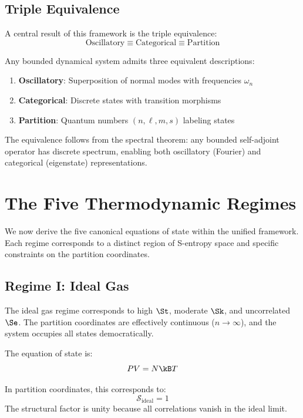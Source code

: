 \subsection{Triple Equivalence}

A central result of this framework is the triple equivalence:
\begin{equation}
\boxed{\text{Oscillatory} \equiv \text{Categorical} \equiv \text{Partition}}
\end{equation}

Any bounded dynamical system admits three equivalent descriptions:
\begin{enumerate}
    \item \textbf{Oscillatory}: Superposition of normal modes with frequencies $\omega_n$
    \item \textbf{Categorical}: Discrete states with transition morphisms
    \item \textbf{Partition}: Quantum numbers $(n, \ell, m, s)$ labeling states
\end{enumerate}

The equivalence follows from the spectral theorem: any bounded self-adjoint operator has discrete spectrum, enabling both oscillatory (Fourier) and categorical (eigenstate) representations.

\section{The Five Thermodynamic Regimes}
\label{sec:regimes}

We now derive the five canonical equations of state within the unified framework. Each regime corresponds to a distinct region of S-entropy space and specific constraints on the partition coordinates.

\subsection{Regime I: Ideal Gas}

The ideal gas regime corresponds to high $\St$, moderate $\Sk$, and uncorrelated $\Se$. The partition coordinates are effectively continuous ($n \to \infty$), and the system occupies all states democratically.

The equation of state is:
\begin{equation}
PV = N\kB T
\end{equation}

In partition coordinates, this corresponds to:
\begin{equation}
\mathcal{S}_{\text{ideal}} = 1
\end{equation}
The structural factor is unity because all correlations vanish in the ideal limit.

